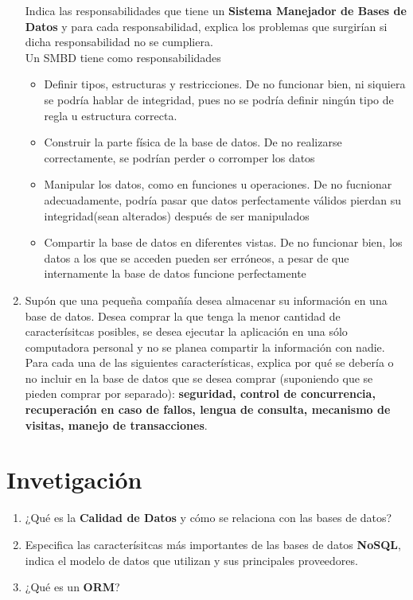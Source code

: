 \documentclass{article}
\begin{document}
\begin{enumerate}[label=\alph*.]
{            Indica las responsabilidades que tiene un \textbf{Sistema Manejador
            de Bases de Datos} y para cada responsabilidad, explica los problemas
            que surgirían si dicha responsabilidad no se cumpliera. \\
            Un SMBD tiene como responsabilidades
            \begin{itemize}
                \item {Definir tipos, estructuras y restricciones. De no 
                funcionar bien, ni siquiera se podría hablar de integridad, pues
                no se podría definir ningún tipo de regla u estructura correcta.}
                \item {Construir la parte física de la base de datos. De no 
                realizarse correctamente, se podrían perder o corromper los datos}
                \item {Manipular los datos, como en funciones u operaciones. De
                no fucnionar adecuadamente, podría pasar que datos perfectamente
                válidos pierdan su integridad(sean alterados) después de ser 
                manipulados}
                \item {Compartir la base de datos en diferentes vistas. De no 
                funcionar bien, los datos a los que se acceden pueden ser erróneos,
                a pesar de que internamente la base de datos funcione 
                perfectamente}
            \end{itemize}
        }
        \item {
            Supón que una pequeña compañía desea almacenar su información en una
            base de datos. Desea comprar la que tenga la menor cantidad de 
            caracterísitcas posibles, se desea ejecutar la aplicación en una 
            sólo computadora personal y no se planea compartir la información con
            nadie. Para cada una de las siguientes características, explica por
            qué se debería o no incluir en la base de datos que se desea comprar
            (suponiendo que se pieden comprar por separado): \textbf{seguridad, 
            control de concurrencia, recuperación en caso de fallos, lengua de 
            consulta, mecanismo de visitas, manejo de transacciones}.
        }
    \end{enumerate}

    \section{Invetigación}
    \begin{enumerate}[label=\alph*.]
        \item {
            ¿Qué es la \textbf{Calidad de Datos} y cómo se relaciona con las 
            bases de datos?
        }
        \item {
            Especifica las caracterísitcas más importantes de las bases de datos
            \textbf{NoSQL}, indica el modelo de datos que utilizan y sus 
            principales proveedores.
        }
        \item {
            ¿Qué es un \textbf{ORM}?
        }
    \end{enumerate}
\end{document}
